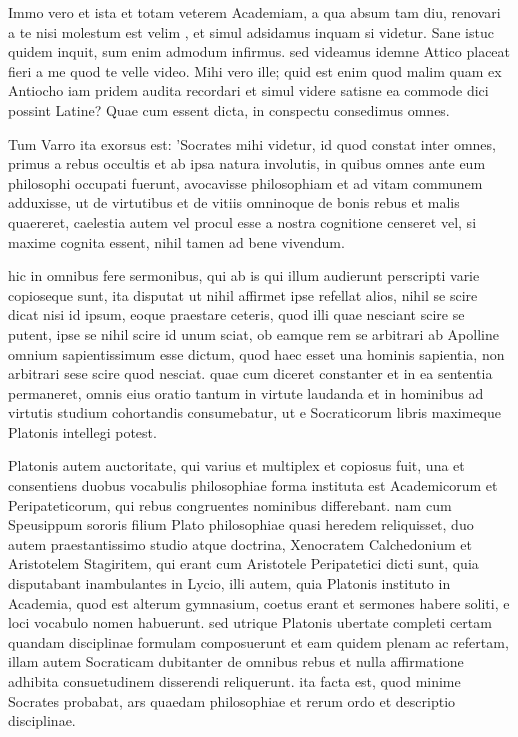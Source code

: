  Immo vero et ista et totam veterem Academiam, a qua absum tam diu, renovari a te nisi molestum est velim , et simul adsidamus inquam si videtur. Sane istuc quidem inquit, sum enim admodum infirmus. sed videamus idemne Attico placeat fieri a me quod te velle video. Mihi vero ille; quid est enim quod malim quam ex Antiocho iam pridem audita recordari et simul videre satisne ea commode dici possint Latine? Quae cum essent dicta, in conspectu consedimus omnes.

 Tum Varro ita exorsus est: 'Socrates mihi videtur, id quod constat inter omnes, primus a rebus occultis et ab ipsa natura involutis, in quibus omnes ante eum philosophi occupati fuerunt, avocavisse philosophiam et ad vitam communem adduxisse, ut de virtutibus et de vitiis omninoque de bonis rebus et malis quaereret, caelestia autem vel procul esse a nostra cognitione censeret vel, si maxime cognita essent, nihil tamen ad bene vivendum.

 hic in omnibus fere sermonibus, qui ab is qui illum audierunt perscripti varie copioseque sunt, ita disputat ut nihil affirmet ipse refellat alios, nihil se scire dicat nisi id ipsum, eoque praestare ceteris, quod illi quae nesciant scire se putent, ipse se nihil scire id unum sciat, ob eamque rem se arbitrari ab Apolline omnium sapientissimum esse dictum, quod haec esset una hominis sapientia, non arbitrari sese scire quod nesciat. quae cum diceret constanter et in ea sententia permaneret, omnis eius oratio tantum in virtute laudanda et in hominibus ad virtutis studium cohortandis consumebatur, ut e Socraticorum libris maximeque Platonis intellegi potest.

 Platonis autem auctoritate, qui varius et multiplex et copiosus fuit, una et consentiens duobus vocabulis philosophiae forma instituta est Academicorum et Peripateticorum, qui rebus congruentes nominibus differebant. nam cum Speusippum sororis filium Plato philosophiae quasi heredem reliquisset, duo autem praestantissimo studio atque doctrina, Xenocratem Calchedonium et Aristotelem Stagiritem, qui erant cum Aristotele Peripatetici dicti sunt, quia disputabant inambulantes in Lycio, illi autem, quia Platonis instituto in Academia, quod est alterum gymnasium, coetus erant et sermones habere soliti, e loci vocabulo nomen habuerunt. sed utrique Platonis ubertate completi certam quandam disciplinae formulam composuerunt et eam quidem plenam ac refertam, illam autem Socraticam dubitanter de omnibus rebus et nulla affirmatione adhibita consuetudinem disserendi reliquerunt. ita facta est, quod minime Socrates probabat, ars quaedam philosophiae et rerum ordo et descriptio disciplinae.

